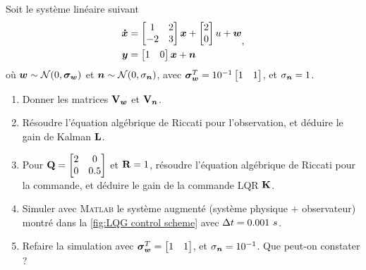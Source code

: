 \begin{exercise}
	Soit le système linéaire suivant 
	\begin{align}
	\begin{split}
	\bm{\dot{x}}&=\begin{bmatrix} 
	1 & 2 \\ -2 & 3  
	\end{bmatrix}\bm{x} + \begin{bmatrix}
	2 \\ 0
	\end{bmatrix}u + \bm{w}  \\
	\bm{y} &= \begin{bmatrix}
	1 & 0
	\end{bmatrix}\bm{x} + \bm{n}
	\end{split},
	\end{align}
	où $\bm{w}\sim{\cal N}(0,\boldsymbol{\sigma}_{\bm{w}})$ et $\bm{n}\sim{\cal N}(0,{\sigma}_{\bm{n}})$, avec $\boldsymbol{\sigma}_{\bm{w}}^T = 10^{-1}\begin{bmatrix} 1 & 1 \end{bmatrix}$, et ${\sigma}_{\bm{n}} = 1$.
	\begin{enumerate}
		\item Donner les matrices $\mathbf{V}_{\bm w}$ et $\mathbf{V}_{\bm n}$.
		\item Résoudre l'équation algébrique de Riccati pour l'observation, et déduire le gain de Kalman $\mathbf{L}$.
		\item Pour $\mathbf{Q} = \begin{bmatrix}2&0\\0&0.5\end{bmatrix}$ et $\mathbf{R}=1$, résoudre l'équation algébrique de Riccati pour la commande, et déduire le gain de la commande LQR $\mathbf{K}$.
		\item Simuler avec \textsc{Matlab} le système augmenté (système physique + observateur) montré dans la \cref{fig:LQG control scheme} avec $\Delta t= 0.001~s$.
		\item Refaire la simulation avec $\boldsymbol{\sigma}_{\bm{w}}^T = \begin{bmatrix} 1 & 1 \end{bmatrix}$, et ${\sigma}_{\bm{n}} = 10^{-1}$. Que peut-on constater ?
	\end{enumerate}
\end{exercise}
